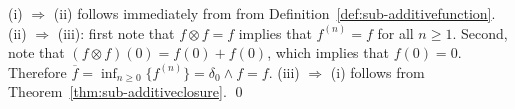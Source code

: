 \pr (i) $\Rightarrow $ (ii) follows immediately from from Definition~\ref{def:sub-additivefunction}.
(ii) $\Rightarrow $ (iii): first note that $f \otimes f = f$ implies that $f^{(n)} = f$ for all $n \geq 1$.
Second, note that $(f \otimes f)(0) = f(0) + f(0) $, which implies that $f(0) = 0$. Therefore
$\overline{f} = \inf_{n \geq 0} \{ f^{(n)} \} = \delta_0 \wedge f = f$.
(iii) $\Rightarrow $ (i) follows from Theorem~\ref{thm:sub-additiveclosure}.
\qed
%
%

